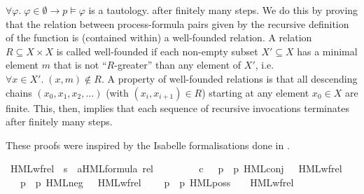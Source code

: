 \begin{isabellebody}
\begin{isamarkuptext}
{$\forall\varphi.\; \varphi \in \emptyset \longrightarrow p \vDash \varphi$
is a tautology.}
after finitely many steps. We do this by proving that the relation between process-formula pairs given by the recursive definition of the function is (contained within) a well-founded relation.
A relation $R \subseteq X \times X$ is called well-founded if each non-empty subset $X' \subseteq X$ has a minimal element $m$ that is not \enquote{$R$-greater} than any element of $X'$, i.e.\@ $\forall x \in X'.\; (x,m) \notin R$.
A property of well-founded relations is that all descending chains $(x_0, x_1, x_2, \dots)$ (with $(x_i, x_{i+1}) \in R$) starting at any element $x_0 \in X$ are finite. This, then, implies that each sequence of recursive invocations terminates after finitely many steps.

These proofs were inspired by the Isabelle formalisations done in \cite{weber2021modal}.%
\end{isamarkuptext}\isamarkuptrue%
\isamarkupfalse%
\ HML{\isacharunderscore}{\kern0pt}wf{\isacharunderscore}{\kern0pt}rel\ {\isacharcolon}{\kern0pt}{\isacharcolon}{\kern0pt}\ {\isacartoucheopen}{\isacharparenleft}{\kern0pt}{\isacharprime}{\kern0pt}s\ {\isasymtimes}\ {\isacharparenleft}{\kern0pt}{\isacharprime}{\kern0pt}a{\isacharparenright}{\kern0pt}HML{\isacharunderscore}{\kern0pt}formula{\isacharparenright}{\kern0pt}\ rel{\isacartoucheclose}\ \isanewline
\ \ \isanewline
\ \ \ \ {\isacartoucheopen}{\isasymphi}\ {\isasymin}\isactrlsub c\ {\isasymPhi}\ {\isasymLongrightarrow}\ {\isacharparenleft}{\kern0pt}{\isacharparenleft}{\kern0pt}p{\isacharcomma}{\kern0pt}\ {\isasymphi}{\isacharparenright}{\kern0pt}{\isacharcomma}{\kern0pt}\ {\isacharparenleft}{\kern0pt}p{\isacharcomma}{\kern0pt}\ HML{\isacharunderscore}{\kern0pt}conj\ {\isasymPhi}{\isacharparenright}{\kern0pt}{\isacharparenright}{\kern0pt}\ {\isasymin}\ HML{\isacharunderscore}{\kern0pt}wf{\isacharunderscore}{\kern0pt}rel{\isacartoucheclose}\ \isanewline
\ \ {\isacharbar}{\kern0pt}\ {\isacartoucheopen}{\isacharparenleft}{\kern0pt}{\isacharparenleft}{\kern0pt}p{\isacharcomma}{\kern0pt}\ {\isasymphi}{\isacharparenright}{\kern0pt}{\isacharcomma}{\kern0pt}\ {\isacharparenleft}{\kern0pt}p{\isacharcomma}{\kern0pt}\ HML{\isacharunderscore}{\kern0pt}neg\ {\isasymphi}{\isacharparenright}{\kern0pt}{\isacharparenright}{\kern0pt}\ {\isasymin}\ HML{\isacharunderscore}{\kern0pt}wf{\isacharunderscore}{\kern0pt}rel{\isacartoucheclose}\ \isanewline
\ \ {\isacharbar}{\kern0pt}\ {\isacartoucheopen}{\isacharparenleft}{\kern0pt}{\isacharparenleft}{\kern0pt}p{\isacharcomma}{\kern0pt}\ {\isasymphi}{\isacharparenright}{\kern0pt}{\isacharcomma}{\kern0pt}\ {\isacharparenleft}{\kern0pt}p{\isacharprime}{\kern0pt}{\isacharcomma}{\kern0pt}\ HML{\isacharunderscore}{\kern0pt}poss\ {\isasymalpha}\ {\isasymphi}{\isacharparenright}{\kern0pt}{\isacharparenright}{\kern0pt}\ {\isasymin}\ HML{\isacharunderscore}{\kern0pt}wf{\isacharunderscore}{\kern0pt}rel{\isacartoucheclose}\isanewline

\end{isabellebody}

